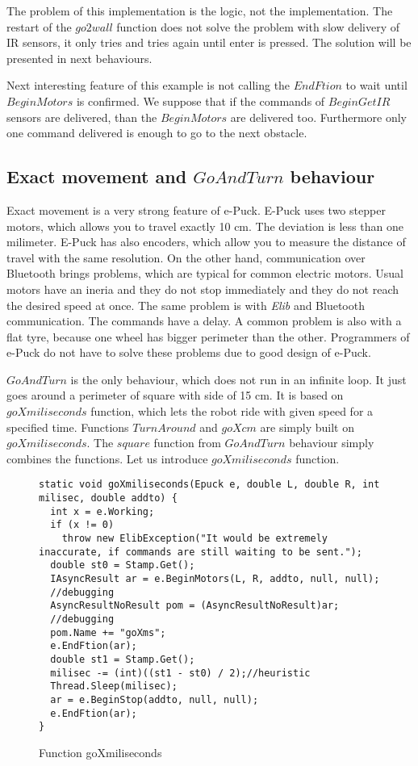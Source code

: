 	The problem of this implementation is the logic, not the implementation. 
	The restart of the $go2wall$ function does not solve the problem with 
	slow delivery of IR sensors, it only tries and tries again until enter is pressed.
	The solution will be presented in next behaviours.

	Next interesting feature of this example is not calling the $EndFtion$ to wait until $BeginMotors$ is confirmed.
	We suppose that if the commands of $BeginGetIR$ sensors are delivered, than the $BeginMotors$ are delivered too.
	Furthermore only one command delivered is enough to go to the next obstacle.

\subsection{Exact movement and $GoAndTurn$ behaviour} \label{sec:go}
	Exact movement is a very strong feature of e-Puck. E-Puck uses two stepper motors,
	which allows you to travel exactly 10 cm. The deviation is less than one milimeter.
	E-Puck has also encoders, which allow you to measure the distance of travel with the same resolution.
	On the other hand, communication over Bluetooth brings problems, which are typical for common electric motors.
	Usual motors have an ineria and they do not stop immediately and they do not reach the desired speed at once. The same problem is with 
	{\it Elib} and Bluetooth communication. The commands have a delay.
	A common problem is also with a flat tyre, because one wheel has bigger perimeter than the other.
	Programmers of e-Puck do not have to solve these problems due to good design of e-Puck.

	$GoAndTurn$ is the only behaviour, which does not run in an infinite loop. 
	It just goes around a perimeter of square with side
	of 15 cm. It is based on $goXmiliseconds$ function, which lets the robot ride with given speed for a specified time.
	Functions $TurnAround$ and $goXcm$ are simply built on $goXmiliseconds$. The $square$ function from $GoAndTurn$ behaviour
	simply combines the functions.
	Let us introduce $goXmiliseconds$ function.
\begin{figure}[!hbp]
\begin{lstlisting}
static void goXmiliseconds(Epuck e, double L, double R, int milisec, double addto) {
  int x = e.Working;
  if (x != 0)
    throw new ElibException("It would be extremely inaccurate, if commands are still waiting to be sent.");
  double st0 = Stamp.Get();
  IAsyncResult ar = e.BeginMotors(L, R, addto, null, null);
  //debugging
  AsyncResultNoResult pom = (AsyncResultNoResult)ar;
  //debugging
  pom.Name += "goXms";
  e.EndFtion(ar);
  double st1 = Stamp.Get();
  milisec -= (int)((st1 - st0) / 2);//heuristic
  Thread.Sleep(milisec);
  ar = e.BeginStop(addto, null, null);
  e.EndFtion(ar);
}
\end{lstlisting}
\caption{Function goXmiliseconds} \label{gox}
\end{figure}

